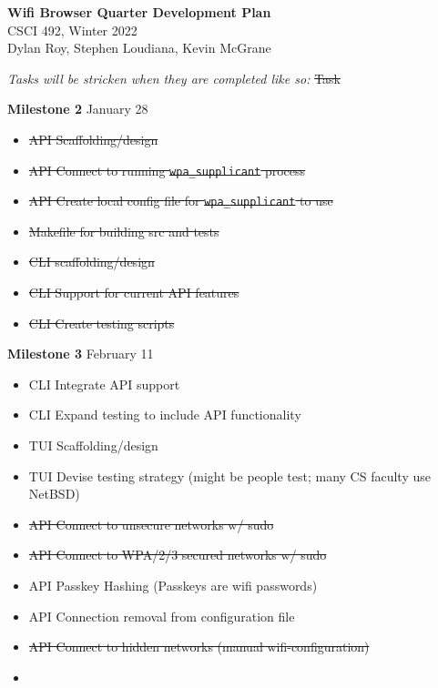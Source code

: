 \documentclass[11pt]{article}
\begin{document}
\begin{center}
  \textbf{\Large Wifi Browser Quarter Development Plan}\\\large CSCI 492, Winter 2022\\
  Dylan Roy, Stephen Loudiana, Kevin McGrane
\end{center}


\textit{Tasks will be stricken when they are completed like so:} \sout{Task}

\textbf{Milestone 2} January 28
\begin{itemize}
  \item\sout{API Scaffolding/design}
  \item\sout{API Connect to running \texttt{wpa\_supplicant} process}
  \item\sout{API Create local config file for \texttt{wpa\_supplicant} to use}
  \item\sout{Makefile for building src and tests}
  \item\sout{CLI scaffolding/design}
  \item\sout{CLI Support for current API features}
  \item\sout{CLI Create testing scripts}
\end{itemize}

\textbf{Milestone 3} February 11
\begin{itemize}
  \item CLI Integrate API support
  \item CLI Expand testing to include API functionality
  \item TUI Scaffolding/design
  \item TUI Devise testing strategy (might be people test; many CS faculty use NetBSD)
  \item\sout{API Connect to unsecure networks w/ sudo}
  \item\sout{API Connect to WPA/2/3 secured networks w/ sudo}
  \item API Passkey Hashing (Passkeys are wifi passwords)
  \item API Connection removal from configuration file
  \item\sout{API Connect to hidden networks (manual wifi-configuration)}
  \item{}
\end{itemize}
\end{document}
